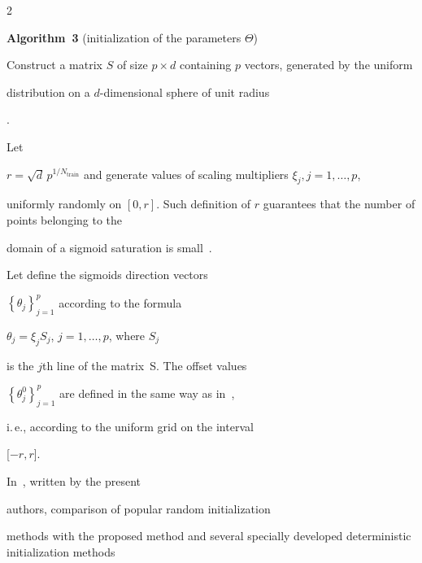 \begin{multicols}{2}
{



}



\bigskip



\noindent

\textbf{Algorithm~3} (initialization of the parameters $\Theta$) %



\noindent

 \begin{enumerate}

    \item {Construct a matrix $S$ of size $p \times d$ containing $p$ vectors, generated by the uniform 

    distribution on a \mbox{$d$-dimensional} sphere of unit radius}. 

    \item {Let

      $r = \sqrt{d}\, p^{1 / N_{\mathrm{train}}}$ and generate values of scaling multipliers $\xi_j, j=1,\dots,p$, 

      uniformly randomly on $[0, r]$. Such definition of $r$ guarantees that the number of points belonging to the 

      domain of a sigmoid saturation is small~\cite{initNW}.

    \item {Let define the sigmoids direction vectors} 

    $\left\{\theta_j \right\}_{j=1}^p$ according to the formula

    $\theta_j = \xi_j S_j$, $j=1,\dots,p$, where ${S}_j$ 

    is the $j$th line of the matrix~S. The offset values 

    $\left\{\theta_j^0\right\}_{j=1}^p$ are defined in the same way as in~\cite{initNW}, 

    i.\,e., according to the uniform grid on the interval} [$-r,r$].

  \end{enumerate}



\medskip



In~\cite{itas11_Yerofeyev}, written by the present

authors, comparison of popular random initialization 

methods with the proposed method and several specially developed deterministic initialization methods 


\end{multicols}
